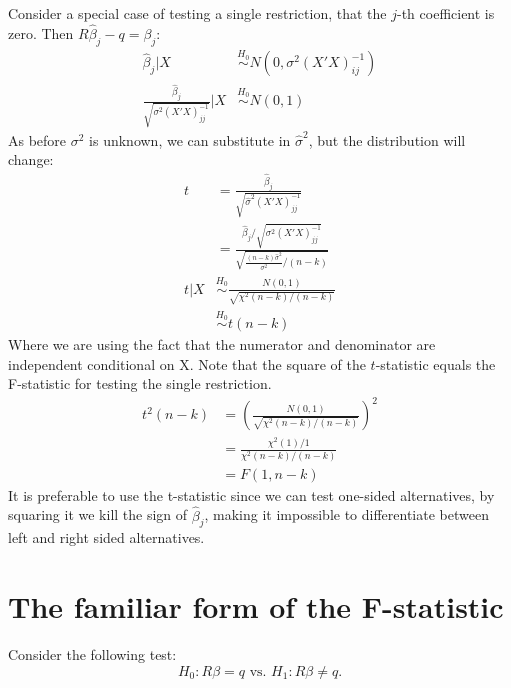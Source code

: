 \documentclass[DIV=14,titlepage=false]{scrreprt}
\begin{document}
Consider a special case of testing a single restriction, that the $j$-th coefficient is zero. Then $R\hat \beta_j -q=\beta_j$:
\begin{align*}
\hat \beta_j|X &\overset{H_0}{\sim}N(0,\sigma^2(X'X)^{-1}_{ij})\\
\frac{\hat \beta_j}{\sqrt{\sigma^2(X'X)^{-1}_{jj}}}|X&\overset{H_0}{\sim}N(0,1)
\end{align*}
As before $\sigma^2$ is unknown, we can substitute in $\hat\sigma^2$, but the distribution will change:
\begin{align*}
t&=\frac{\hat\beta_j}{\sqrt{\hat\sigma^2(X'X)^{-1}_{jj}}}\\
 &= \frac{\hat\beta_j/{\sqrt{\sigma^2(X'X)^{-1}_{jj}}}}{\sqrt{\frac{(n-k)\hat\sigma^2}{\sigma^2}/(n-k)}}\\
 t|X &\overset{H_0}{\sim} \frac{N(0,1)}{\sqrt{\chi^2(n - k)/(n - k)}}\\
 &\overset{H_0}{\sim} t(n-k)
\end{align*}
Where we are using the fact that the numerator and denominator are independent conditional on X. Note that the square of the $t$-statistic equals the F-statistic for testing the single restriction.
\begin{align*}
t^2(n-k) &= \left(\frac{N(0,1)}{\sqrt{\chi^2(n - k)/(n - k)}}\right)^2\\
&= \frac{\chi^2(1)/1}{\chi^2(n - k)/(n - k)}\\
&= F(1,n-k)
\end{align*}
It is preferable to use the t-statistic since we can test one-sided alternatives, by squaring it we kill the sign of $\hat\beta_j$, making it impossible to differentiate between left and right sided alternatives.
\section{The familiar form of the F-statistic}
Consider the following test:\[ H_0: R\beta = q \text{ vs. } H_1: R\beta \not = q.\]
\end{document}
